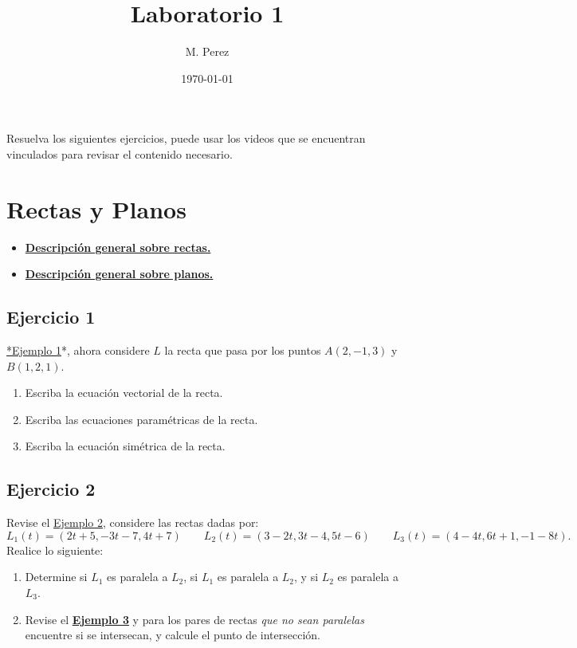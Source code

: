 \documentclass[11pt]{article}
\author{M. Perez}
\date{\today}
\title{Laboratorio 1}
\begin{document}
\maketitle
\tableofcontents

Resuelva los siguientes ejercicios, puede usar los videos que se encuentran vinculados para revisar el contenido necesario.


\section{Rectas y Planos}
\label{sec:orgfeae2ce}

\begin{itemize}
\item \textbf{\href{https://vimeo.com/574240696}{Descripción general sobre rectas.}}
\item \textbf{\href{https://vimeo.com/574240985}{Descripción general sobre planos.}}
\end{itemize}

\subsection{Ejercicio 1}
\label{sec:org76685f9}

\href{https://vimeo.com/574240748}{*Ejemplo 1}*, ahora considere \(L\) la recta que pasa por los puntos \(A(2, -1, 3)\) y \(B(1, 2, 1)\).
\begin{enumerate}
\item Escriba la ecuación vectorial de la recta.
\item Escriba las ecuaciones paramétricas de la recta.
\item Escriba la ecuación simétrica de la recta.
\end{enumerate}


\subsection{Ejercicio 2}
\label{sec:orgf4e44a4}

Revise el \href{https://vimeo.com/574240843}{Ejemplo 2}, considere las rectas dadas por:
\[
    L_1(t) = (2t + 5, -3t - 7, 4t + 7)
    \qquad
    L_2(t) = (3 - 2t, 3t - 4, 5t - 6)
    \qquad
    L_3(t) = (4 - 4t, 6t + 1, -1 - 8t).
  \]
Realice lo siguiente:
\begin{enumerate}
\item Determine si \(L_1\) es paralela a \(L_2\), si \(L_1\) es paralela a \(L_2\), y si \(L_2\) es paralela a \(L_3\).
\item Revise el \textbf{\href{https://vimeo.com/574240895}{Ejemplo 3}} y para los pares de rectas \emph{que no sean paralelas} encuentre si se intersecan, y calcule el punto de intersección.
\end{enumerate}
\end{document}
